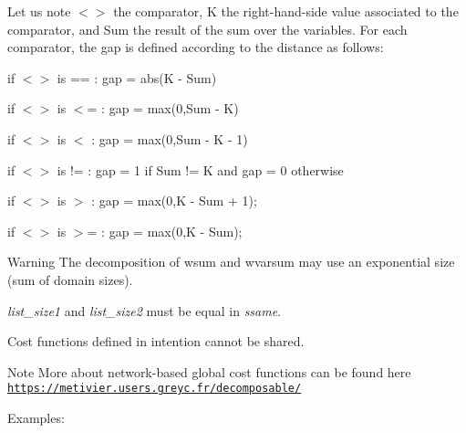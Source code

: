 \documentclass{article}
\begin{document}
\begin{DoxyItemize}
\begin{DoxyItemize}
Let us note $<$$>$ the comparator, K the right-\/hand-\/side value associated to the comparator, and Sum the result of the sum over the variables. For each comparator, the gap is defined according to the distance as follows\-:
\begin{DoxyItemize}
\item if $<$$>$ is == \-: gap = abs(K -\/ Sum)
\item if $<$$>$ is $<$= \-: gap = max(0,Sum -\/ K)
\item if $<$$>$ is $<$ \-: gap = max(0,Sum -\/ K -\/ 1)
\item if $<$$>$ is != \-: gap = 1 if Sum != K and gap = 0 otherwise
\item if $<$$>$ is $>$ \-: gap = max(0,K -\/ Sum + 1);
\item if $<$$>$ is $>$= \-: gap = max(0,K -\/ Sum);
\end{DoxyItemize}
\end{DoxyItemize}
\end{DoxyItemize}\begin{DoxyWarning}{Warning}
The decomposition of wsum and wvarsum may use an exponential size (sum of domain sizes). 

{\itshape list\-\_\-size1} and {\itshape list\-\_\-size2} must be equal in {\itshape ssame}. 

Cost functions defined in intention cannot be shared.
\end{DoxyWarning}
\begin{DoxyNote}{Note}
More about network-\/based global cost functions can be found here \href{https://metivier.users.greyc.fr/decomposable/}{\tt https\-://metivier.\-users.\-greyc.\-fr/decomposable/}
\end{DoxyNote}
Examples\-:
\end{document}
